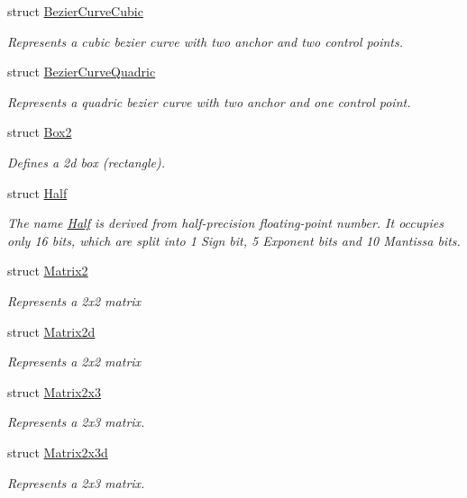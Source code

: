 \begin{DoxyCompactItemize}
struct \hyperlink{struct_open_t_k_1_1_bezier_curve_cubic}{Bezier\-Curve\-Cubic}
\begin{DoxyCompactList}\small\item\em Represents a cubic bezier curve with two anchor and two control points. \end{DoxyCompactList}\item 
struct \hyperlink{struct_open_t_k_1_1_bezier_curve_quadric}{Bezier\-Curve\-Quadric}
\begin{DoxyCompactList}\small\item\em Represents a quadric bezier curve with two anchor and one control point. \end{DoxyCompactList}\item 
struct \hyperlink{struct_open_t_k_1_1_box2}{Box2}
\begin{DoxyCompactList}\small\item\em Defines a 2d box (rectangle). \end{DoxyCompactList}\item 
struct \hyperlink{struct_open_t_k_1_1_half}{Half}
\begin{DoxyCompactList}\small\item\em The name \hyperlink{struct_open_t_k_1_1_half}{Half} is derived from half-\/precision floating-\/point number. It occupies only 16 bits, which are split into 1 Sign bit, 5 Exponent bits and 10 Mantissa bits. \end{DoxyCompactList}\item 
struct \hyperlink{struct_open_t_k_1_1_matrix2}{Matrix2}
\begin{DoxyCompactList}\small\item\em Represents a 2x2 matrix \end{DoxyCompactList}\item 
struct \hyperlink{struct_open_t_k_1_1_matrix2d}{Matrix2d}
\begin{DoxyCompactList}\small\item\em Represents a 2x2 matrix \end{DoxyCompactList}\item 
struct \hyperlink{struct_open_t_k_1_1_matrix2x3}{Matrix2x3}
\begin{DoxyCompactList}\small\item\em Represents a 2x3 matrix. \end{DoxyCompactList}\item 
struct \hyperlink{struct_open_t_k_1_1_matrix2x3d}{Matrix2x3d}
\begin{DoxyCompactList}\small\item\em Represents a 2x3 matrix. \end{DoxyCompactList}\item 

\end{DoxyCompactItemize}
